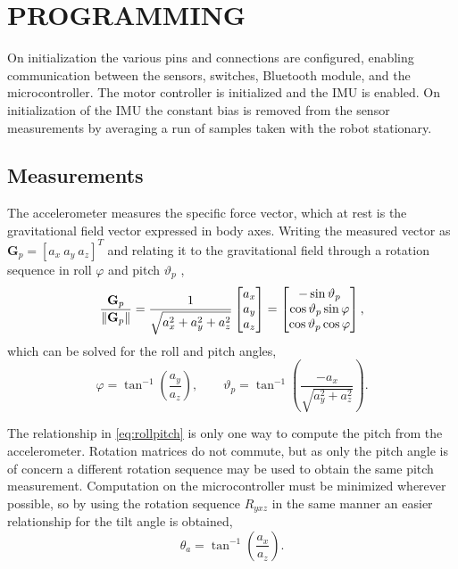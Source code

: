 \section{PROGRAMMING}

On initialization the various pins and connections are configured, enabling
communication between the sensors, switches, Bluetooth module, and the
microcontroller. The motor controller is initialized and the IMU is enabled. On
initialization of the IMU the constant bias is removed from the sensor
measurements by averaging a run of samples taken with the robot stationary.

\subsection{Measurements}
\label{sec:measurements}

The accelerometer measures the specific force vector, which at rest is the
gravitational field vector expressed in body axes. Writing the measured vector
as $\mathbf{G}_p=[a_x\ a_y\ a_z]^T$ and relating it to the gravitational field
through a rotation sequence in roll $\varphi$ and pitch $\vartheta_p$
\cite{kuipers1999quaternions},
\begin{equation}\label{eq:gravvec}
\frac{\mathbf{G}_p}{\left\lVert \mathbf{G}_p \right\rVert}
=\frac{1}{\sqrt{a_x^2+a_y^2+a_z^2}}
\begin{bmatrix}a_x\\a_y\\a_z\end{bmatrix}
=\begin{bmatrix}
-\sin\vartheta_p\\
\cos\vartheta_p\sin\varphi\\
\cos\vartheta_p\cos\varphi
\end{bmatrix},
\end{equation}
which can be solved for the roll and pitch angles,
\begin{equation}\label{eq:rollpitch}
\varphi=\tan^{-1}\!\left(\frac{a_y}{a_z}\right),
\qquad
\vartheta_p=\tan^{-1}\!\left(\frac{-a_x}{\sqrt{a_y^2+a_z^2}}\right).
\end{equation}

The relationship in \eqref{eq:rollpitch} is only one way to compute the pitch
from the accelerometer. Rotation matrices do not commute, but as only the pitch
angle is of concern a different rotation sequence may be used to obtain the same
pitch measurement. Computation on the microcontroller must be minimized wherever
possible, so by using the rotation sequence $R_{yxz}$ in the same manner an
easier relationship for the tilt angle is obtained,
\begin{equation}\label{eq:tiltaccel}
\theta_a=\tan^{-1}\!\left(\frac{a_x}{a_z}\right).
\end{equation}

